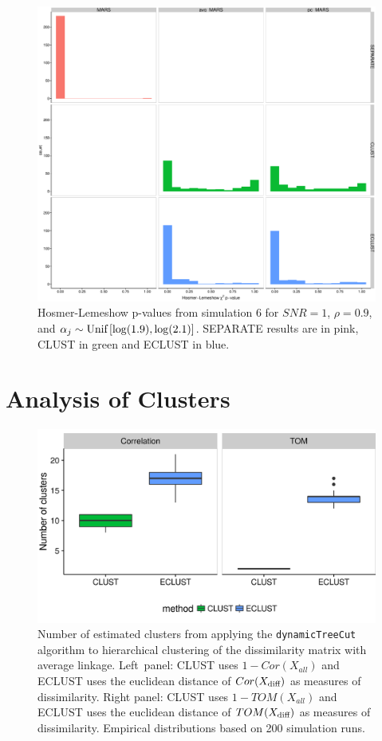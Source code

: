\begin{figure}[H]
	\centering\includegraphics[width=1\linewidth]{./figs/guillimin/results/figures/sim4-5-6-combined/calibration-pvalue_sim6.eps}
	\caption{Hosmer-Lemeshow p-values from simulation 6 for $SNR=1$, $\rho = 0.9$, and \mbox{$\alpha_{j} \sim \textrm{{Unif}}\left[\log(1.9), \log(2.1)\right]$}. SEPARATE results are in pink, CLUST in green and ECLUST in blue.}\label{fig:sim-calibrationhist6}
\end{figure}


\section{Analysis of Clusters}\label{ap:clusters}

\begin{figure}[H]
	\centering
	\includegraphics[scale=0.9, keepaspectratio]{./figs/figures-for-manuscript/nclusters.png}
	\caption{Number of estimated clusters from applying the \texttt{dynamicTreeCut} algorithm to hierarchical clustering of the dissimilarity matrix with average linkage. \mbox{Left panel}: CLUST uses $1-Cor(X_{all})$ and ECLUST uses the euclidean distance of $Cor(X_{\textrm{{diff}}})$ as measures of dissimilarity. Right panel: CLUST uses $1-TOM(X_{all})$ and ECLUST uses the euclidean distance of $TOM(X_{\textrm{{diff}}})$ as measures of dissimilarity. Empirical distributions based on 200 simulation runs.}
	\label{fig:compare_clusters}
\end{figure}


